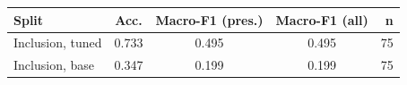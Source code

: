 \begin{tabular}{lccc r}
\hline
Split & Acc. & Macro-F1 (pres.) & Macro-F1 (all) & n \\
\hline
Inclusion, tuned & 0.733 & 0.495 & 0.495 & 75 \\
Inclusion, base & 0.347 & 0.199 & 0.199 & 75 \\
\hline
\end{tabular}
